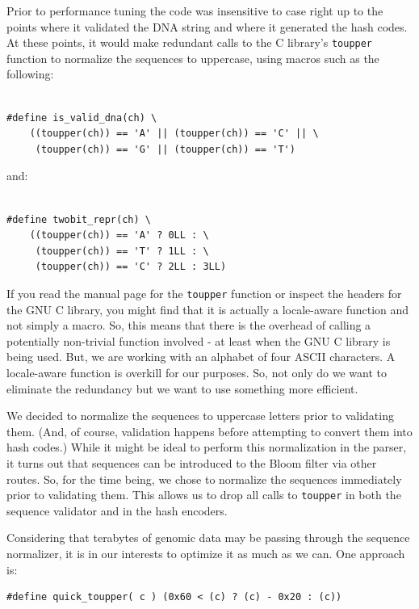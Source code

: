 \documentclass{article}
\begin{document}
Prior to performance tuning the code was insensitive to case right up
to the points where it validated the DNA string and where it generated the hash
codes. At these points, it would make redundant calls to the C library's
\texttt{toupper} function to normalize the sequences to uppercase, using macros
such as the following:

\begin{verbatim}

#define is_valid_dna(ch) \
    ((toupper(ch)) == 'A' || (toupper(ch)) == 'C' || \
     (toupper(ch)) == 'G' || (toupper(ch)) == 'T')

\end{verbatim}

and:

\begin{verbatim}

#define twobit_repr(ch) \
    ((toupper(ch)) == 'A' ? 0LL : \
     (toupper(ch)) == 'T' ? 1LL : \
     (toupper(ch)) == 'C' ? 2LL : 3LL)

\end{verbatim}

If you read the manual page for the \texttt{toupper} function or inspect the
headers for the GNU C library, you might find that it is actually a
locale-aware function and not simply a macro. So, this means that there is the
overhead of calling a potentially non-trivial function involved - at least when
the GNU C library is being used. But, we are working with an alphabet of four
ASCII characters. A locale-aware function is overkill for our purposes.  So,
not only do we want to eliminate the redundancy but we want to use something
more efficient.

We decided to normalize the sequences to uppercase letters prior to validating
them. (And, of course, validation happens before attempting to convert them
into hash codes.) While it might be ideal to perform this normalization in the
parser, it turns out that sequences can be introduced to the Bloom filter via
other routes. So, for the time being, we chose to normalize the sequences
immediately prior to validating them. This allows us to drop all calls to
\texttt{toupper} in both the sequence validator and in the hash encoders.

Considering that terabytes of genomic data may be passing through the sequence
normalizer, it is in our interests to optimize it as much as we can. One
approach is:

\begin{verbatim}
#define quick_toupper( c ) (0x60 < (c) ? (c) - 0x20 : (c))
\end{verbatim}
\end{document}
